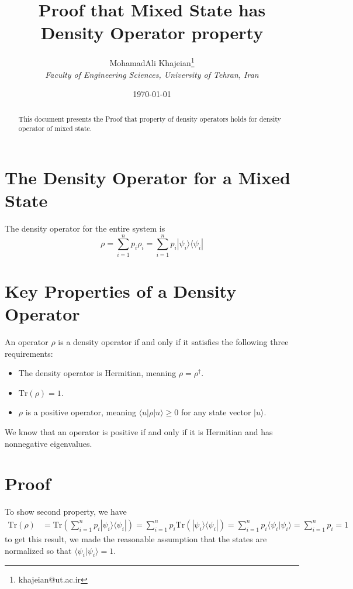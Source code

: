 \documentclass[12pt]{article}
\title{\textbf{Proof that Mixed State has Density Operator property}}
\author{
    MohamadAli Khajeian\footnote{khajeian@ut.ac.ir} \\ 
    \small \textit{Faculty of Engineering Sciences, University of Tehran, Iran} \\ 
}
\date{\today}
\begin{document}
\maketitle

\begin{abstract}
    This document presents the Proof that property of density operators holds for density operator of mixed state.
\end{abstract}

\section*{The Density Operator for a Mixed State}

The density operator for the entire system is
\begin{equation}
    \label{1}
    \rho = \sum_{i=1}^{n} p_i \rho_i = \sum_{i=1}^{n} p_i |\psi_i\rangle \langle \psi_i|    
\end{equation}


\section*{Key Properties of a Density Operator}

An operator $\rho$ is a density operator if and only if it satisfies the following three requirements:
\begin{itemize}
    \item The density operator is Hermitian, meaning $\rho = \rho^\dagger$.
    \item $\text{Tr}(\rho) = 1$.
    \item $\rho$ is a positive operator, meaning $\langle u | \rho | u \rangle \geq 0$ for any state vector $|u\rangle$.
\end{itemize}

We know that an operator is positive if and only if it is Hermitian and has nonnegative eigenvalues.

\section*{Proof}
To show second property, we have
\begin{align*}
    \text{Tr}(\rho) &= \text{Tr} \left( \sum_{i=1}^{n} p_i |\psi_i \rangle \langle \psi_i| \right) = \sum_{i=1}^{n} p_i \text{Tr}(|\psi_i \rangle \langle \psi_i|) = \sum_{i=1}^{n} p_i \langle \psi_i | \psi_i \rangle = \sum_{i=1}^{n} p_i = 1
    \end{align*}    
to get this result, we made the reasonable assumption that the states are normalized so that $\langle \psi_i | \psi_i \rangle = 1$.
    
\end{document}
